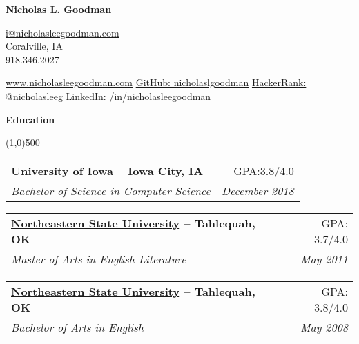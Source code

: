 \documentclass[letterpaper,11pt]{article}
\makeatletter
\newcommand{\resheading}[1]{{\large {\begin{minipage}{\textwidth}{\textbf{#1 \vphantom{p\^{E}}}}\end{minipage}}}}
\newcommand{\ressubheading}[4]
{\begin{tabular*}{6.8in}{l@{\extracolsep{\fill}}r}
		\textbf{#1} & #2 \\
		\textit{#3} & \textit{#4} \\
\end{tabular*}\vspace{-6pt}}
\makeatother
\begin{document}
\newcommand{\mywebheader}{

    \begin{center}
    	\textbf{\href{http://www.nicholasleegoodman.com/}{\LARGE Nicholas L. Goodman}\\[0.25\baselineskip]}
    	

		
		\href{mailto:i@nicholasleegoodman.com}{i@nicholasleegoodman.com}
		\\[0.25\baselineskip]
	
		Coralville, IA 
		\\[0.25\baselineskip]
	
	    918.346.2027
	\end{center}

	\begin{multicols}{2}

	\href{http://www.nicholasleegoodman.com}{www.nicholasleegoodman.com}  
	\href{https://github.com/nicholaslgoodman}{GitHub: nicholaslgoodman} 
	\href{https://www.hackerrank.com/nicholasleeg}{HackerRank: @nicholasleeg}
	\href{https://www.linkedin.com/in/nicholasleegoodman}{LinkedIn: /in/nicholasleegoodman} 	

	\end{multicols}
\renewcommand{\labelitemi}{$-$}
\vspace{0.1in}}
\mywebheader


\resheading {Education}

\line(1,0){500}

	\begin{description}

		\item
		\ressubheading{\href{http://www.uiowa.edu}{University of Iowa}{ -- Iowa City, IA}}{GPA:3.8/4.0}
			{\href{https://cs.uiowa.edu/undergraduate-programs/computer-science}{Bachelor of Science in Computer Science}}
			{ \footnotesize{December 2018}}
			
		\item
			\ressubheading {\href{http://www.nsuok.edu}{Northeastern State University}{ -- Tahlequah, OK}}{GPA: 3.7/4.0}
			{Master of Arts in English Literature}
			{ \footnotesize{May 2011}}
			
		\item
			\ressubheading {\href{http://www.nsuok.edu}{Northeastern State University}{ -- Tahlequah, OK}}{GPA: 3.8/4.0}
			{Bachelor of Arts in English}
			{ \footnotesize{May 2008}}

		\end{description} %
\end{document}
